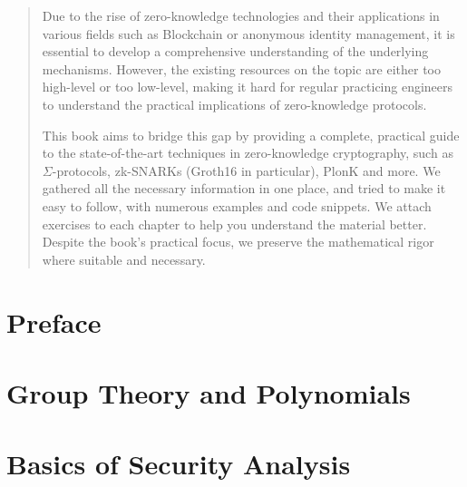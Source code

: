 \documentclass{zkdl-template-105x135-nohead}
\begin{document}
    \begin{abstract}
        \fontsize{7}{8}\selectfont
        Due to the rise of zero-knowledge technologies and their applications in
        various fields such as Blockchain or anonymous identity management, it is
        essential to develop a comprehensive understanding of the underlying
        mechanisms. However, the existing resources on the topic are either too
        high-level or too low-level, making it hard for regular practicing engineers
        to understand the practical implications of zero-knowledge protocols.
    
        This book aims to bridge this gap by providing a complete, practical guide
        to the state-of-the-art techniques in zero-knowledge cryptography, such as
        $\Sigma$-protocols, zk-SNARKs (Groth16 in particular), PlonK and more. We
        gathered all the necessary information in one place, and tried to make it
        easy to follow, with numerous examples and code snippets. We attach
        exercises to each chapter to help you understand the material better.
        Despite the book's practical focus, we preserve the mathematical rigor where
        suitable and necessary.
    \end{abstract}
    
    \newpage

    \pagecolor{white}

    \tableofcontents

    \pagebreak


    \section*{Preface}

    

    \section{Group Theory and Polynomials} \label{section:math-crypto-1}

    

    \section{Basics of Security Analysis}\label{section:math-crypto-2}

    
\end{document}
